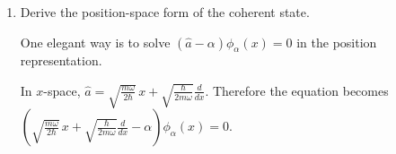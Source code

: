 \documentclass[11pt,a4paper]{scrartcl}
\begin{document}
\begin{enumerate}[label=(\alph*)]
\begin{calculationbox}
    Similarly,$\langle P\rangle_\alpha
        = -i\sqrt{\frac{m\hbar\omega}{2}}
        \left(\langle \hat a\rangle_\alpha - \langle \hat a^\dagger\rangle_\alpha\right)
        = -i\sqrt{\frac{m\hbar\omega}{2}}(\alpha-\alpha^*)
        = \sqrt{2m\hbar\omega}\Im(\alpha)$.

    Now for the variances. First,
    $
    X^2 = \frac{\hbar}{2m\omega}\left(\hat a^2 + \hat a\hat a^\dagger + \hat a^\dagger \hat a + (\hat a^\dagger)^2\right).
    $

    Using $\hat a\hat a^\dagger=\hat a^\dagger\hat a+1$ and the coherent-state expectation values

    $
    \langle \hat a\rangle=\alpha,\quad
    \langle \hat a^\dagger\rangle=\alpha^*,\quad
    \langle \hat a^2\rangle=\alpha^2,\quad
    \langle (\hat a^\dagger)^2\rangle=(\alpha^*)^2,\quad
    \langle \hat a^\dagger \hat a\rangle=|\alpha|^2,
    $

    we find $\langle X^2\rangle_\alpha
        = \frac{\hbar}{2m\omega}
        \left(\alpha^2 + (\alpha^*)^2 + |\alpha|^2 + (|\alpha|^2+1)\right)
        = \frac{\hbar}{2m\omega}
        \left(\alpha^2 + (\alpha^*)^2 + 2|\alpha|^2 + 1\right)$.

    On the other hand, $\langle X\rangle_\alpha^2
        = \frac{\hbar}{2m\omega}(\alpha+\alpha^*)^2 \\
        = \frac{\hbar}{2m\omega}
        \left(\alpha^2+(\alpha^*)^2+2|\alpha|^2\right)$.
    Therefore
    $
    \Delta X_\alpha^2
    = \langle X^2\rangle_\alpha - \langle X\rangle_\alpha^2
    = \frac{\hbar}{2m\omega},
    $

    so
    $
    \Delta X_\alpha=\sqrt{\frac{\hbar}{2m\omega}}.
    $

    Likewise one finds
    $
    \Delta P_\alpha=\sqrt{\frac{m\hbar\omega}{2}}.
    $

    So
    $
    \Delta X_\alpha \Delta P_\alpha
    = \sqrt{\frac{\hbar}{2m\omega}}\sqrt{\frac{m\hbar\omega}{2}}
    = \frac{\hbar}{2}.
    $
    So coherent states are minimum-uncertainty states.
    \end{calculationbox}


    \item  Derive the position-space form of the coherent state.

    \begin{calculationbox}
    One elegant way is to solve
    $
    (\hat a-\alpha)\phi_\alpha(x)=0
    $
    in the position representation.

    In $x$-space,
    $
    \hat a =
    \sqrt{\frac{m\omega}{2\hbar}}\,x
    +
    \sqrt{\frac{\hbar}{2m\omega}}\frac{d}{dx}.
    $
    Therefore the equation becomes
    $
    \left(
    \sqrt{\frac{m\omega}{2\hbar}}\,x
    +
    \sqrt{\frac{\hbar}{2m\omega}}\frac{d}{dx}
    -\alpha
    \right)\phi_\alpha(x)=0.
    $


\end{calculationbox}
\end{enumerate}
\end{document}
